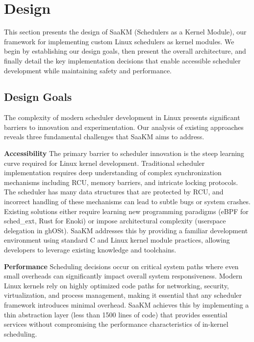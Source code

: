 
\section{Design}
\label{sec:design}

This section presents the design of SaaKM (Schedulers as a Kernel Module), our framework for implementing custom Linux schedulers as kernel modules. We begin by establishing our design goals, then present the overall architecture, and finally detail the key implementation decisions that enable accessible scheduler development while maintaining safety and performance.

\subsection{Design Goals}

The complexity of modern scheduler development in Linux presents significant barriers to innovation and experimentation. Our analysis of existing approaches reveals three fundamental challenges that SaaKM aims to address.

\parspace
\textbf{Accessibility} The primary barrier to scheduler innovation is the steep learning curve required for Linux kernel development. Traditional scheduler implementation requires deep understanding of complex synchronization mechanisms including RCU, memory barriers, and intricate locking protocols. The scheduler has many data structures that are protected by RCU, and incorrect handling of these mechanisms can lead to subtle bugs or system crashes. Existing solutions either require learning new programming paradigms (eBPF for sched\_ext, Rust for Enoki) or impose architectural complexity (userspace delegation in ghOSt). SaaKM addresses this by providing a familiar development environment using standard C and Linux kernel module practices, allowing developers to leverage existing knowledge and toolchains.

\parspace
\textbf{Performance} Scheduling decisions occur on critical system paths where even small overheads can significantly impact overall system responsiveness. Modern Linux kernels rely on highly optimized code paths for networking, security, virtualization, and process management, making it essential that any scheduler framework introduces minimal overhead. SaaKM achieves this by implementing a thin abstraction layer (less than 1500 lines of code) that provides essential services without compromising the performance characteristics of in-kernel scheduling.

